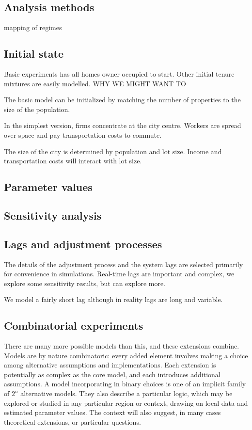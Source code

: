 \subsection{Analysis methods}
mapping of regimes

\subsection{Initial state}
Basic experiments has all homes owner occupied to start. Other initial tenure mixtures are easily modelled. WHY WE MIGHT WANT TO

The basic model can be initialized by matching the number of properties to the size of the population. 

In the simplest version, firms concentrate at the city centre. Workers are spread over space and pay transportation costs to commute.

The size of the city is determined by population and lot size. Income and transportation costs will interact with lot size. 


\subsection{Parameter values}


\subsection{Sensitivity analysis}


\subsection{Lags and adjustment processes}
The details of the adjustment process and the system lags are selected primarily for convenience in simulations. Real-time lags are important and complex, we explore some sensitivity results, but can explore more. 

We model a fairly short lag although in reality lags are long and variable. 


\subsection{Combinatorial experiments}

There are many more possible models than this, and these extensions combine. Models are by nature combinatoric: every added element involves making a choice among alternative assumptions and implementations. Each extension is potentially as complex as the core model, and each introduces additional assumptions.  A model incorporating in binary choices is one of an implicit family of $2^n$ alternative models. 
They also describe a particular logic, which may be explored or studied in any particular region or context, drawing on local data and estimated parameter values. The context will also suggest, in many cases theoretical extensions, or particular questions.


